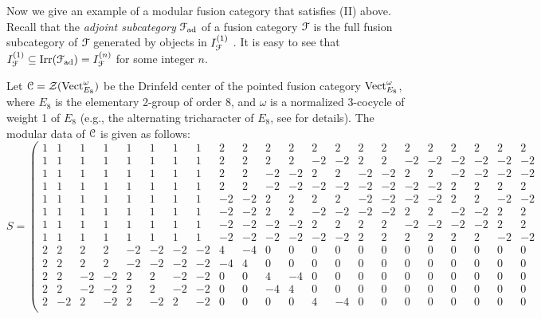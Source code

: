 \documentclass[11pt]{article}
\begin{document}
Now we give an example of a modular fusion category that satisfies (II) above. Recall that the \emph{adjoint subcategory} ${\mathcal{F}}_{{\operatorname{ad}}}$ of a fusion category ${\mathcal{F}}$ is the full fusion subcategory of ${\mathcal{F}}$ generated by objects in $I^{(1)}_{{\mathcal{F}}}$ \cite[Sec.~3]{GN08}. It is easy to see that $I^{(1)}_{{\mathcal{F}}} \subseteq {\operatorname{Irr}}({\mathcal{F}}_{{\operatorname{ad}}}) = I^{(n)}_{{\mathcal{F}}}$ for some integer $n$.

\begin{example}\label{ex:DwD8}
Let $\cC = \zdr(\Vec_{E_{8}}^\w)$ be the Drinfeld center of the pointed fusion category ${\operatorname{Vect}}_{E_{8}}^\omega$, where $E_8$ is the elementary 2-group of order 8, and $\omega$ is a normalized 3-cocycle of weight 1 of $E_8$ (e.g., the alternating tricharacter of $E_8$, see \cite[Sec.\ 5]{GMN07} for details). The modular data of $\mathcal{C}$ is given as follows:
\[
S = \left(
\begin{smallmatrix}
1 & 1 & 1 & 1 & 1 & 1 & 1 & 1 & 2 & 2 & 2 & 2 & 2 & 2 & 2 & 2 & 2 & 2 & 2 & 2 & 2 & 2 \\
1 & 1 & 1 & 1 & 1 & 1 & 1 & 1 & 2 & 2 & 2 & 2 & -2 & -2 & 2 & 2 & -2 & -2 & -2 & -2 & -2 & -2 \\
1 & 1 & 1 & 1 & 1 & 1 & 1 & 1 & 2 & 2 & -2 & -2 & 2 & 2 & -2 & -2 & 2 & 2 & -2 & -2 & -2 & -2 \\
1 & 1 & 1 & 1 & 1 & 1 & 1 & 1 & 2 & 2 & -2 & -2 & -2 & -2 & -2 & -2 & -2 & -2 & 2 & 2 & 2 & 2 \\
1 & 1 & 1 & 1 & 1 & 1 & 1 & 1 & -2 & -2 & 2 & 2 & 2 & 2 & -2 & -2 & -2 & -2 & 2 & 2 & -2 & -2 \\
1 & 1 & 1 & 1 & 1 & 1 & 1 & 1 & -2 & -2 & 2 & 2 & -2 & -2 & -2 & -2 & 2 & 2 & -2 & -2 & 2 & 2 \\
1 & 1 & 1 & 1 & 1 & 1 & 1 & 1 & -2 & -2 & -2 & -2 & 2 & 2 & 2 & 2 & -2 & -2 & -2 & -2 & 2 & 2 \\
1 & 1 & 1 & 1 & 1 & 1 & 1 & 1 & -2 & -2 & -2 & -2 & -2 & -2 & 2 & 2 & 2 & 2 & 2 & 2 & -2 & -2 \\
2 & 2 & 2 & 2 & -2 & -2 & -2 & -2 & 4 & -4 & 0 & 0 & 0 & 0 & 0 & 0 & 0 & 0 & 0 & 0 & 0 & 0 \\
2 & 2 & 2 & 2 & -2 & -2 & -2 & -2 & -4 & 4 & 0 & 0 & 0 & 0 & 0 & 0 & 0 & 0 & 0 & 0 & 0 & 0 \\
2 & 2 & -2 & -2 & 2 & 2 & -2 & -2 & 0 & 0 & 4 & -4 & 0 & 0 & 0 & 0 & 0 & 0 & 0 & 0 & 0 & 0 \\
2 & 2 & -2 & -2 & 2 & 2 & -2 & -2 & 0 & 0 & -4 & 4 & 0 & 0 & 0 & 0 & 0 & 0 & 0 & 0 & 0 & 0 \\
2 & -2 & 2 & -2 & 2 & -2 & 2 & -2 & 0 & 0 & 0 & 0 & 4 & -4 & 0 & 0 & 0 & 0 & 0 & 0 & 0 & 0 \\

\end{smallmatrix}\]
\end{example}
\end{document}

